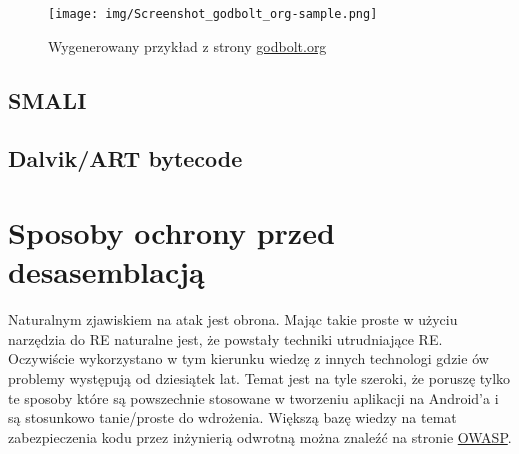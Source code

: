 \documentclass[12pt,a4paper,leqno,oneside,titlepage]{book}
\begin{document}
\begin{figure}[h!]
	\centering
	\texttt{[image: img/Screenshot\_godbolt\_org-sample.png]}
	\caption{Wygenerowany przykład z strony \url{godbolt.org}}
\end{figure}


\section{SMALI}
\label{smali}

\section{Dalvik/ART bytecode}


\chapter{Sposoby ochrony przed desasemblacją}
Naturalnym zjawiskiem na atak jest obrona. Mając takie proste w użyciu narzędzia do RE naturalne jest, że powstały techniki utrudniające RE. Oczywiście wykorzystano w tym kierunku wiedzę z innych technologi gdzie ów problemy występują od dziesiątek lat. Temat jest na tyle szeroki, że poruszę tylko te sposoby które są powszechnie stosowane w tworzeniu aplikacji na Android'a i są stosunkowo tanie/proste do wdrożenia. Większą bazę wiedzy na temat zabezpieczenia kodu przez inżynierią odwrotną można znaleźć na stronie \hyperlink{https://www.owasp.org/index.php/OWASP_Reverse_Engineering_and_Code_Modification_Prevention_Project}{OWASP}.
\end{document}
